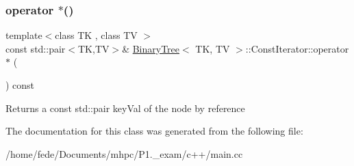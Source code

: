 \subsubsection{\texorpdfstring{operator $\ast$()}{operator *()}}
{\footnotesize\ttfamily template$<$class TK , class TV $>$ \\
const std\+::pair$<$TK,TV$>$\& \mbox{\hyperlink{classBinaryTree}{Binary\+Tree}}$<$ TK, TV $>$\+::Const\+Iterator\+::operator $\ast$ (\begin{DoxyParamCaption}{ }\end{DoxyParamCaption}) const\hspace{0.3cm}{\ttfamily [inline]}}

Returns a const std\+::pair key\+Val of the node by reference 

The documentation for this class was generated from the following file\+:\begin{DoxyCompactItemize}
\item 
/home/fede/\+Documents/mhpc/\+P1.\+\_\+exam/c++/main.\+cc\end{DoxyCompactItemize}
